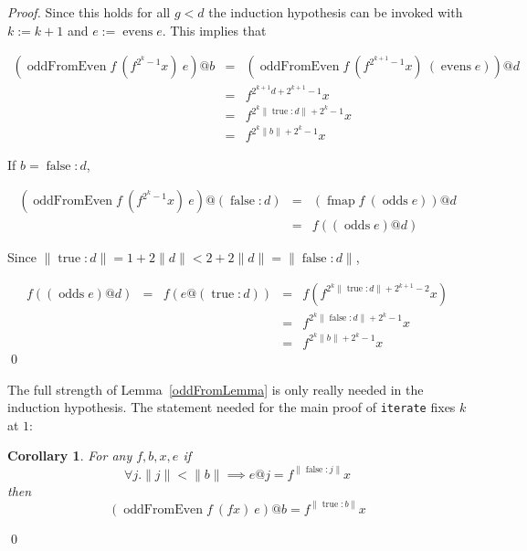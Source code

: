 \documentclass[envcountsect]{llncs}
\DeclareMathOperator{\oddFrom}{oddFromEven}
\DeclareMathOperator{\true}{true}
\DeclareMathOperator{\false}{false}
\DeclareMathOperator{\evens}{evens}
\DeclareMathOperator{\odds}{odds}
\DeclareMathOperator{\fmap}{fmap}
\newcommand{\ord}[1]{\|#1\|}
\newcommand{\cons}[2]{#1:#2}
\newtheorem{corollary}[theorem]{Corollary}
\begin{document}
\begin{proof}
Since this holds for all $g < d$ the induction hypothesis can be invoked with $k := k+1$ and $e := \evens e$.
This implies that

\begin{displaymath}
\begin{array}{rcl}
(\oddFrom f\ (f^{2^k-1}x)\ e)@b & = & (\oddFrom f\ (f^{2^{k+1}-1}x)\ (\evens e))@d \\
& = & f^{2^{k+1}d+2^{k+1}-1} x \\
& = & f^{2^k\ord{\cons{\true}{d}}+2^k-1} x \\
& = & f^{2^k\ord{b}+2^k-1} x
\end{array}
\end{displaymath}

If $b = \cons{\false}{d}$,

\begin{displaymath}
\begin{array}{rcl}
(\oddFrom f\ (f^{2^k-1}x)\ e)@(\cons{\false}{d})& = & (\fmap f\ (\odds e))@d \\
& = & f ((\odds e)@d)
\end{array}
\end{displaymath}

Since
$\ord{\cons{\true}{d}} = 1+2\ord{d} < 2+2\ord{d} = \ord{\cons{\false}{d}}$,

\begin{displaymath}
\begin{array}{rcccl}
f((\odds e)@d) & = & f(e@(\cons{\true}{d})) & = & f(f^{2^k\ord{\cons{\true}{d}}+2^{k+1}-2}x) \\
& & & = & f^{2^k\ord{\cons{\false}{d}}+2^k-1}x \\
& & & = & f^{2^k\ord{b}+2^k-1}x
\end{array}
\end{displaymath}
\qed
\end{proof}

The full strength of Lemma~\ref{oddFromLemma} is only really needed in the induction hypothesis.
The statement needed for the main proof of \verb|iterate| fixes $k$ at $1$:

\begin{corollary}\label{oddFromCorollary}
For any $f, b, x, e$
if
\begin{displaymath}
\forall j . \ord{j} < \ord{b} \implies e@j = f^{\ord{\cons{\false}{j}}}x
\end{displaymath}
then
\begin{displaymath}
(\oddFrom f\ (f x)\ e)@b = f^{\ord{\cons{\true}{b}}}x
\end{displaymath}
\end{corollary}
\qed
\end{document}
